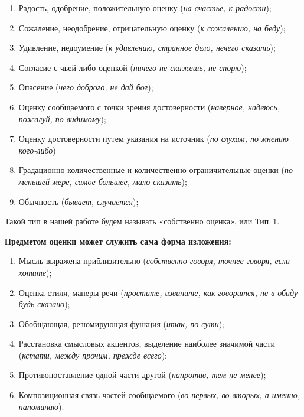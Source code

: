 \documentclass{kursa4}
\begin{document}
      \begin{enumerate}
        \item Радость, одобрение, положительную оценку (\textit{на счастье, к
        радости});
        \item Сожаление, неодобрение, отрицательную оценку (\textit{к сожалению,
        на беду});
        \item Удивление, недоумение (\textit{к удивлению, странное дело, нечего
        сказать});
        \item Согласие с чьей-либо оценкой (\textit{ничего не скажешь, не
        спорю});
        \item Опасение (\textit{чего доброго, не дай бог});
        \item Оценку сообщаемого с точки зрения достоверности (\textit{наверное,
        надеюсь, пожалуй, по-видимому});
        \item Оценку достоверности путем указания на источник (\textit{по
        слухам, по мнению кого-либо})
        \item Градационно-количественные и количественно-ограничительные оценки
        (\textit{по меньшей мере, самое большее, мало сказать});
        \item Обычность (\textit{бывает, случается});
      \end{enumerate}

      Такой тип в нашей работе будем называть «собственно оценка», или Тип~1. 

      \textbf{Предметом оценки может служить сама форма изложения:}
      \begin{enumerate}
        \item Мысль выражена приблизительно (\textit{собственно говоря, точнее
        говоря, если хотите});
        \item Оценка стиля, манеры речи (\textit{простите, извините, как
        говорится, не в обиду будь сказано});
        \item Обобщающая, резюмирующая функция (\textit{итак, по сути});
        \item Расстановка смысловых акцентов, выделение наиболее значимой части
        (\textit{кстати, между прочим, прежде всего});
        \item Противопоставление одной части другой (\textit{напротив, тем не
        менее});
        \item Композиционная связь частей сообщаемого (\textit{во-первых, во-вторых, а именно, напоминаю}).
      \end{enumerate}
\end{document}
